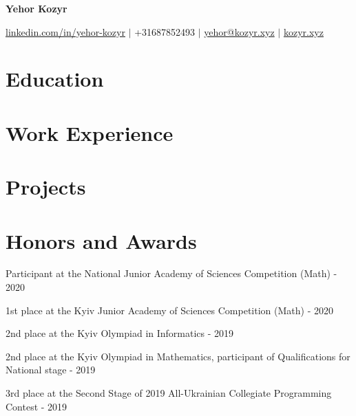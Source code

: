 \documentclass[a4paper,21pt]{article}
\begin{document}
\begin{center} \textbf{\LARGE{Yehor Kozyr}} \end{center}
\vspace{-12pt}
\begin{center}
\href{https://www.linkedin.com/in/yehor-kozyr/}{linkedin.com/in/yehor-kozyr} $\vert$ +31687852493 $\vert$ \href{mailto:yehor@kozyr.xyz}{yehor@kozyr.xyz} $\vert$ \href{https://kozyr.xyz}{kozyr.xyz} \end{center}


\section{Education}
  \resumeSubHeadingListStart
    
    \vspace{-8pt}
    
\resumeSubHeadingListEnd

\vspace{-8pt}
\section{Work Experience}
  \resumeSubHeadingListStart
    
    \vspace{-8pt}
    
  \resumeSubHeadingListEnd
\vspace{-6pt}
\section{Projects}
\resumeSubHeadingListStart
  
  \vspace{-8pt}
  
\resumeSubHeadingListEnd

\vspace{-5pt}
\section{Honors and Awards}
\begin{description}[font=$\bullet$]
\item {Participant at the National Junior Academy of Sciences Competition (Math) - 2020}
\vspace{-5pt}
\item {1st place at the Kyiv Junior Academy of Sciences Competition (Math) - 2020}
\vspace{-5pt}
\item {2nd place at the Kyiv Olympiad in Informatics - 2019}
\vspace{-5pt}
\item {2nd place at the Kyiv Olympiad in Mathematics, participant of Qualifications for National stage - 2019}
\vspace{-5pt}
\item {3rd place at the Second Stage of 2019 All-Ukrainian Collegiate Programming Contest - 2019}
\end{description}
\end{document}
